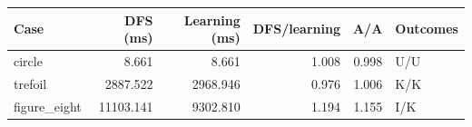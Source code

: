 \begin{tabular}{lrrrrl}
\toprule
Case & DFS (ms) & Learning (ms) & DFS/learning & A/A & Outcomes \\
\midrule
circle & 8.661 & 8.661 & 1.008 & 0.998 & U/U \\
trefoil & 2887.522 & 2968.946 & 0.976 & 1.006 & K/K \\
figure\_eight & 11103.141 & 9302.810 & 1.194 & 1.155 & I/K \\
\bottomrule
\end{tabular}
